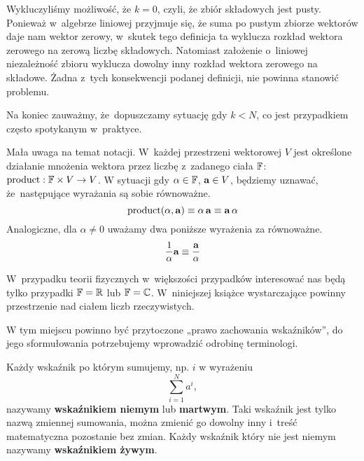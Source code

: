 \documentclass[a4paper,11pt]{article}
\numberwithin{equation}{section}
\begin{document}
Wykluczyliśmy możliwość, że $k = 0$, czyli, że zbiór składowych jest pusty.
Ponieważ w~algebrze liniowej przyjmuje się, że suma po pustym zbiorze
wektorów daje nam wektor zerowy, w~skutek tego definicja ta wyklucza rozkład
wektora zerowego na zerową liczbę składowych. Natomiast założenie o~liniowej
niezależność zbioru wyklucza dowolny inny rozkład wektora zerowego na
składowe. Żadna z~tych konsekwencji podanej definicji, nie powinna stanowić
problemu.

Na koniec zauważmy, że~dopuszczamy sytuację gdy $k < N$, co jest przypadkiem
często spotykanym w~praktyce.

\VerSpaceFour





\noindent
{} Mała uwaga na temat notacji. W~każdej przestrzeni wektorowej $V$
jest określone działanie mnożenia wektora przez liczbę z~zadanego
ciała $\mathbb{F}$: $\textrm{product} : \mathbb{F} \times V \to V$. W sytuacji gdy $\alpha \in \mathbb{F}$,
$\mathbf{a} \in V$, będziemy uznawać, że~następujące wyrażania są sobie
równoważne.
\begin{equation}
  \label{eq:SkalmierskiMechanika-03}
  \textrm{product}( \alpha, \mathbf{a} ) \equiv \alpha \, \mathbf{a} \equiv \mathbf{a} \, \alpha
\end{equation}
Analogiczne, dla $\alpha \neq 0$ uważamy dwa poniższe wyrażenia za równoważne.
\begin{equation}
  \label{eq:SkalmierskiMechanika-04}
  \frac{ 1 }{ \alpha } \mathbf{a} \equiv \frac{ \mathbf{a} }{ \alpha }
\end{equation}

W~przypadku teorii fizycznych w~większości przypadków interesować nas będą
tylko przypadki $\mathbb{F} = \mathbb{R}$ lub $\mathbb{F} = \mathbb{C}$. W~niniejszej książce
wystarczające powinny przestrzenie nad ciałem liczb rzeczywistych.

\VerSpaceFour





\noindent
{} W tym miejscu powinno być przytoczone „prawo zachowania
wskaźników”, do jego sformułowania potrzebujemy wprowadzić odrobinę
terminologi.

Każdy wskaźnik po którym sumujemy, np. $i$ w wyrażeniu
\begin{equation}
  \label{eq:SkalmierskiMechanika-05}
  \sum_{ i = 1 }^{ N } a^{ i },
\end{equation}
nazywamy \textbf{wskaźnikiem niemym} lub \textbf{martwym}. Taki wskaźnik
jest tylko nazwą zmiennej sumowania, można zmienić go dowolny inny i~treść
matematyczna pozostanie bez zmian. Każdy wskaźnik który nie jest niemym
nazywamy \textbf{wskaźnikiem żywym}.
\end{document}
